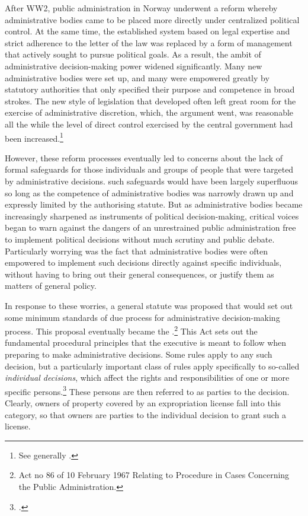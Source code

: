 After WW2, public administration in Norway underwent a reform whereby administrative bodies came to be placed more directly under centralized political control. At the same time, the established system based on legal expertise and strict adherence to the letter of the law was replaced by a form of management that actively sought to pursue political goals. As a result, the ambit of administrative decision-making power widened significantly. Many new administrative bodies were set up, and many were empowered greatly by statutory authorities that only specified their purpose and competence in broad strokes. The new style of legislation that developed often left great room for the exercise of administrative discretion, which, the argument went, was reasonable all the while the level of direct control exercised by the central government had been increased.\footnote{See generally \cite{grønli..}.}

However, these reform processes eventually led to concerns about the lack of formal safeguards for those individuals and groups of people that were targeted by administrative decisions. such safeguards would have been largely superfluous so long as the competence of administrative bodies was narrowly drawn up and expressly limited by the authorising statute. But as administrative bodies became increasingly sharpened as instruments of political decision-making, critical voices began to warn against the dangers of an unrestrained public administration free to implement political decisions without much scrutiny and public debate. Particularly worrying was the fact that administrative bodies were often empowered to implement such decisions directly against specific individuals, without having to bring out their general consequences, or justify them as matters of general policy.

In response to these worries, a general statute was proposed that would set out some minimum standards of due process for administrative decision-making process. This proposal eventually became the \cite{paa67}.\footnote{Act no 86 of 10 February 1967 Relating to Procedure in Cases Concerning the Public Administration.} This Act sets out the fundamental procedural principles that the executive is meant to follow when preparing to make administrative decisions. Some rules apply to any such decision, but a particularly important class of rules apply specifically to so-called {\it individual decisions}, which affect the rights and responsibilities of one or more specific persons.\footcite[2]{paa67} These persons are then referred to as parties to the decision. Clearly, owners of property covered by an expropriation license fall into this category, so that owners are parties to the individual decision to grant such a license.

